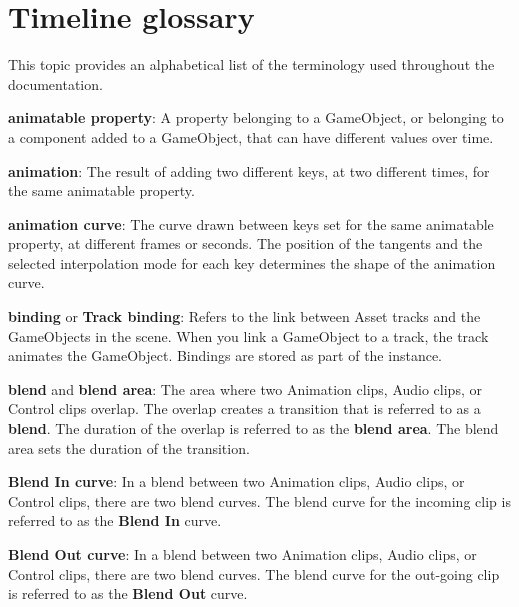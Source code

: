 \chapter{Timeline glossary}
\hypertarget{md__library_2_package_cache_2com_8unity_8timeline_0d1_87_86_2_documentation_0i_2tl__gloss}{}\label{md__library_2_package_cache_2com_8unity_8timeline_0d1_87_86_2_documentation_0i_2tl__gloss}
\label{md__library_2_package_cache_2com_8unity_8timeline_0d1_87_86_2_documentation_0i_2tl__gloss_autotoc_md1236}%
%
 This topic provides an alphabetical list of the terminology used throughout the  documentation.

{\bfseries{animatable property}}\+: A property belonging to a Game\+Object, or belonging to a component added to a Game\+Object, that can have different values over time.

{\bfseries{animation}}\+: The result of adding two different keys, at two different times, for the same animatable property.

{\bfseries{animation curve}}\+: The curve drawn between keys set for the same animatable property, at different frames or seconds. The position of the tangents and the selected interpolation mode for each key determines the shape of the animation curve.

{\bfseries{binding}} or {\bfseries{Track binding}}\+: Refers to the link between  Asset tracks and the Game\+Objects in the scene. When you link a Game\+Object to a track, the track animates the Game\+Object. Bindings are stored as part of the  instance.

{\bfseries{blend}} and {\bfseries{blend area}}\+: The area where two Animation clips, Audio clips, or Control clips overlap. The overlap creates a transition that is referred to as a {\bfseries{blend}}. The duration of the overlap is referred to as the {\bfseries{blend area}}. The blend area sets the duration of the transition.

{\bfseries{Blend In curve}}\+: In a blend between two Animation clips, Audio clips, or Control clips, there are two blend curves. The blend curve for the incoming clip is referred to as the {\bfseries{Blend In}} curve.

{\bfseries{Blend Out curve}}\+: In a blend between two Animation clips, Audio clips, or Control clips, there are two blend curves. The blend curve for the out-\/going clip is referred to as the {\bfseries{Blend Out}} curve.

